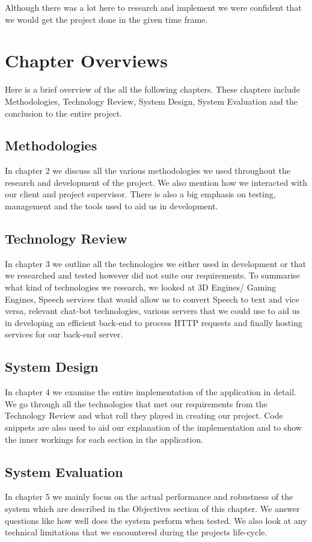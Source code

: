 Although there was a lot here to research and implement we were confident that we would get the project done in the given time frame.


\section{Chapter Overviews}
Here is a brief overview of the all the following chapters. These chapters include Methodologies, Technology Review, System Design, System Evaluation and the conclusion to the entire project.
\subsection{Methodologies}
In chapter 2 we discuss all the various methodologies we used throughout the research and development of the project. We also mention how we interacted with our client and project supervisor. There is also a big emphasis on testing, management and the tools used to aid us in development. 
\subsection{Technology Review}
In chapter 3 we outline all the technologies we either used in development or that we researched and tested however did not suite our requirements. To summarise what kind of technologies we research, we looked at 3D Engines/ Gaming Engines, Speech services that would allow us to convert Speech to text and vice versa, relevant chat-bot technologies, various servers that we could use to aid us in developing an efficient back-end to process HTTP requests and finally hosting services for our back-end server. 
\subsection{System Design}
In chapter 4 we examine the entire implementation of the application in detail. We go through all the technologies that met our requirements from the Technology Review and what roll they played in creating our project. Code snippets are also used to aid our explanation of the implementation and to show the inner workings for each section in the application.
\subsection{System Evaluation}
In chapter 5 we mainly focus on the actual performance and robustness of the system which are described in the Objectives section of this chapter. We answer questions like how well does the system perform when tested. We also look at any technical limitations that we encountered during the projects life-cycle. 
